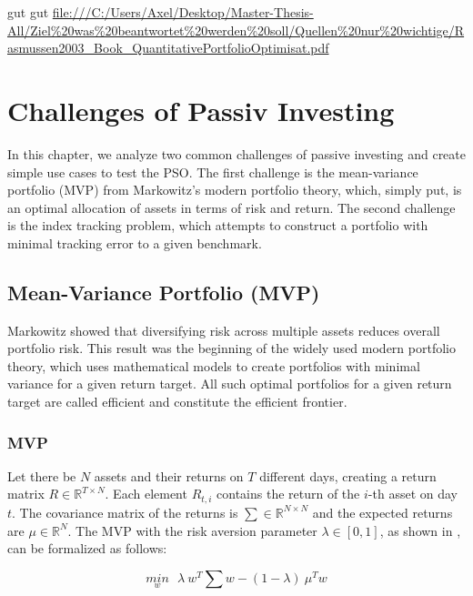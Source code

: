 \documentclass[
  oneside]{book}
\begin{document}
gut gut
\url{file:///C:/Users/Axel/Desktop/Master-Thesis-All/Ziel\%20was\%20beantwortet\%20werden\%20soll/Quellen\%20nur\%20wichtige/Rasmussen2003_Book_QuantitativePortfolioOptimisat.pdf}

\hypertarget{challenges}{%
\chapter{Challenges of Passiv Investing}\label{challenges}}

In this chapter, we analyze two common challenges of passive investing and create simple use cases to test the PSO. The first challenge is the mean-variance portfolio (MVP) from Markowitz's modern portfolio theory, which, simply put, is an optimal allocation of assets in terms of risk and return. The second challenge is the index tracking problem, which attempts to construct a portfolio with minimal tracking error to a given benchmark.

\hypertarget{mean-variance-portfolio-mvp}{%
\section{Mean-Variance Portfolio (MVP)}\label{mean-variance-portfolio-mvp}}

Markowitz showed that diversifying risk across multiple assets reduces overall portfolio risk. This result was the beginning of the widely used modern portfolio theory, which uses mathematical models to create portfolios with minimal variance for a given return target. All such optimal portfolios for a given return target are called efficient and constitute the efficient frontier.

\hypertarget{mvp}{%
\subsection{MVP}\label{mvp}}

Let there be \(N\) assets and their returns on \(T\) different days, creating a return matrix \(R \in \mathbb{R}^{T \times N}\). Each element \(R_{t,i}\) contains the return of the \(i\)-th asset on day \(t\). The covariance matrix of the returns is \(\textstyle\sum \in \mathbb{R}^{N \times N}\) and the expected returns are \(\mu \in \mathbb{R}^{N}\). The MVP with the risk aversion parameter \(\lambda \in [0,1]\), as shown in \citep{Mari2005}, can be formalized as follows:

\begin{equation} 
\underset{w}{min} \ \ \ \lambda \ w^T \textstyle\sum w - (1-\lambda) \ \mu^T w
\label{eq:MVP}
\end{equation}
\end{document}
